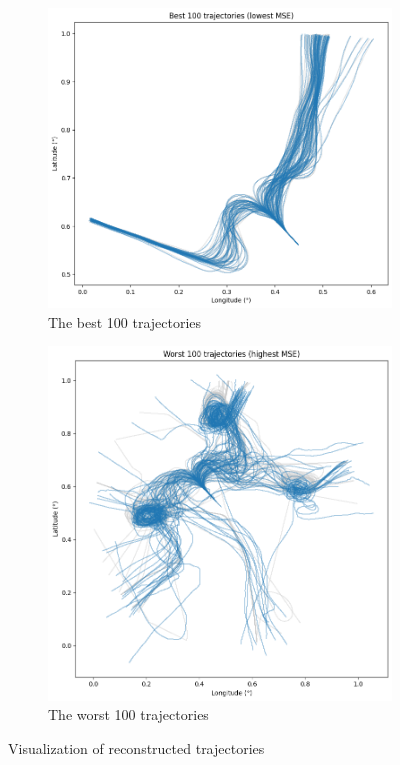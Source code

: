 \begin{figure}
	\centering
	\begin{subfigure}[t]{0.4\textwidth}
		\centering
		\includegraphics[width=\textwidth]{best100}
		\caption{The best 100 trajectories}  
		\label{fig:best100}  
	\end{subfigure}
\hspace{0.05\textwidth}	
\begin{subfigure}[t]{0.45\textwidth}
	\centering
	\includegraphics[width=\textwidth]{worst100}
	\caption{The worst 100 trajectories}  
	\label{fig:worst100}
\end{subfigure}
\caption{Visualization of reconstructed trajectories}
\label{conparison of best and worst}
\end{figure}

